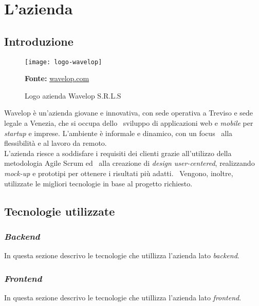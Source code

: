 
\chapter{L'azienda}
\label{cap:azienda}
\section{Introduzione}

\vspace{20pt}
  \begin{figure}[!ht]
    \begin{center}
      \texttt{[image: logo-wavelop]}
      \caption{Logo azienda Wavelop S.R.L.S}
      \textbf{Fonte:} \href{https://www.wavelop.com}{wavelop.com}
    \end{center}
  \end{figure}
\vspace{20pt} 

Wavelop è un’azienda giovane e innovativa, con sede operativa a Treviso e sede legale a Venezia, che si occupa dello \
sviluppo di applicazioni web e \emph{mobile} per \emph{startup} e imprese. L’ambiente è informale e dinamico, con un focus \
alla flessibilità e al lavoro da remoto. \\

L’azienda riesce a soddisfare i requisiti dei clienti grazie all’utilizzo della metodologia Agile Scrum ed \
alla creazione di \emph{design user-centered}, realizzando \emph{\gls{mock-up}} e prototipi per ottenere i risultati più adatti. \
Vengono, inoltre, utilizzate le migliori tecnologie in base al progetto richiesto.

\section{Tecnologie utilizzate}

\subsection{\emph{Backend}}
In questa sezione descrivo le tecnologie che utillizza l'azienda lato \emph{backend}.

\subsection{\emph{Frontend}}
In questa sezione descrivo le tecnologie che utillizza l'azienda lato \emph{frontend}.


